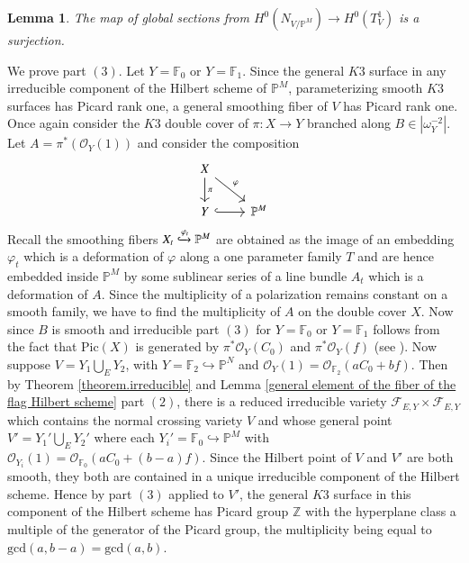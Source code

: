 \documentclass[11pt,twoside]{amsart}
\theoremstyle{plain}
\numberwithin{equation}{section}
\newtheorem{lemma}[theorem]{Lemma}
\theoremstyle{definition}
\begin{document}
\begin{lemma}\label{alternate smoothing}
The map of global sections from $H^0(N_{V/\mathbb{P}^M}) \to H^0(T_V^1)$ is a surjection. 
\end{lemma}

We prove part $(3)$. Let $Y = \mathbb{F}_0$ or $Y = \mathbb{F}_1$. Since the general $K3$ surface in any irreducible component of the Hilbert scheme of $\mathbb{P}^M$, parameterizing smooth $K3$ surfaces has Picard rank one, a general smoothing fiber of $V$ has Picard rank one. Once again consider the $K3$ double cover of $\pi:X \to Y$ branched along $B \in |\omega_Y^{-2}|$. Let $A = \pi^*(\mathcal{O}_{Y}(1))$ and consider the composition  
\[
\begin{tikzcd}
X \arrow[dr, "\varphi"] \arrow[d, "\pi"] & \\
Y \arrow[r, hook] & \mathbb{P}^M
\end{tikzcd}
\]
Recall the smoothing fibers $X_t \xhookrightarrow{\varphi_t} \mathbb{P}^M$ are obtained as the image of an embedding $\varphi_t$ which is a deformation of $\varphi$ along a one parameter family $T$ and are hence embedded inside $\mathbb{P}^M$ by some sublinear series of a line bundle $A_t$ which is a deformation of $A$. Since the multiplicity of a polarization remains constant on a smooth family, we have to find the multiplicity of $A$ on the double cover $X$. Now since $B$ is smooth and irreducible part $(3)$ for $Y = \mathbb{F}_0$ or $Y = \mathbb{F}_1$ follows from the fact that $\textrm{Pic}(X)$ is generated by $\pi^*\mathcal{O}_Y(C_0)$ and $\pi^*\mathcal{O}_Y(f)$ (see \cite[Proposition $6.3$]{AHL10}). Now suppose $V = Y_1 \bigcup_E Y_2$, with $Y = \mathbb{F}_2 \hookrightarrow \mathbb{P}^N$ and $\mathcal{O}_Y(1) = \mathcal{O}_{\mathbb{F}_2}(aC_0+bf)$. Then by Theorem \ref{theorem.irreducible} and Lemma \ref{general element of the fiber of the flag Hilbert scheme} part $(2)$, there is a reduced irreducible variety $\mathcal{F}_{E,Y} \times \mathcal{F}_{E,Y}$ which contains the normal crossing variety $V$ and whose general point $V' = Y_1' \bigcup_E Y_2'$ where each $Y_i' = \mathbb{F}_0 \hookrightarrow \mathbb{P}^M$ with $\mathcal{O}_{Y_i}(1) = \mathcal{O}_{\mathbb{F}_0}(aC_0+(b-a)f)$. Since the Hilbert point of $V$ and $V'$ are both smooth, they both are contained in a unique irreducible component of the Hilbert scheme. Hence by part $(3)$ applied to $V'$, the general $K3$ surface in this component of the Hilbert scheme has Picard group $\mathbb{Z}$ with the hyperplane class a multiple of the generator of the Picard group, the multiplicity being equal to $\textrm{gcd}(a,b-a) = \textrm{gcd}(a,b)$. 
\end{document}
